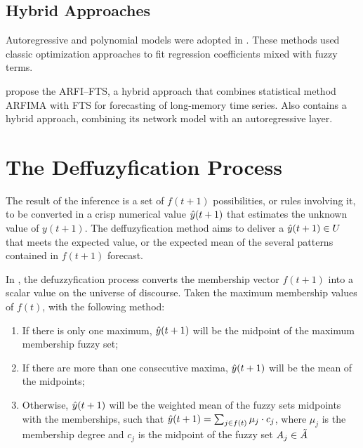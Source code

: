 \subsection{Hybrid Approaches}
\label{sec:fts_hybrid}

Autoregressive and polynomial models were adopted in \cite{Chang1997, Tseng1999, Askari2015, Talarposhti2016a}. These methods used classic optimization approaches to fit regression coefficients mixed with fuzzy terms.

\cite{JavedaniSadaei2016c} propose the ARFI–FTS, a hybrid approach that combines statistical method ARFIMA with FTS for forecasting of long-memory time series. Also \cite{Bas2015} contains a hybrid approach, combining its network model with an autoregressive layer.


%
\section{The Deffuzyfication Process}
\label{sec:fts_defuzzyfication}

The result of the inference is a set of $f(t+1)$ possibilities, or rules involving it, to be converted in a crisp numerical value $\hat{y}(t+1)$ that estimates the unknown value of $y(t+1)$. The deffuzyfication method aims to deliver a $\hat{y}(t+1) \in U$ that meets the expected value, or the expected mean of the several patterns contained in $f(t+1)$ forecast.

In \cite{song1993fuzzy}, the defuzzyfication process converts the membership vector $f(t+1)$ into a scalar value on the universe of discourse. Taken the maximum membership values of $f(t)$, with the following method:

\begin{enumerate}
\item If there is only one maximum, $\hat{y}(t+1)$ will be the midpoint of the maximum membership fuzzy set;
\item If there are more than one consecutive maxima, $\hat{y}(t+1)$ will be the mean of the midpoints;
\item Otherwise, $\hat{y}(t+1)$ will be the weighted mean of the fuzzy sets midpoints with the memberships, such that $\hat{y}(t+1) = \sum_{j \in f(t)} \mu_j\cdot c_j$, where $\mu_j$ is the membership degree and $c_j$ is the midpoint of the fuzzy set $A_j \in \tilde{A}$ 
\end{enumerate}

